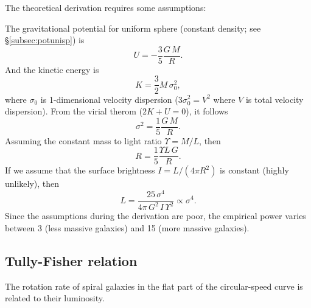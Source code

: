 The theoretical derivation requires some assumptions:

The gravitational potential for uniform sphere (constant density; see \S\ref{subsec:potunisp}) is 
\begin{equation}
    U = -\frac{3}{5} \frac{G\,M}{R}.
\end{equation}
And the kinetic energy is 
\begin{equation}
    K = \frac{3}{2} M\,\sigma_{0}^{2},
\end{equation}
where $\sigma_{0}$ is 1-dimensional velocity dispersion ($3\sigma_{0}^{2} = V^{2}$ where $V$
is total velocity dispersion). From the virial therom ($2K+U=0$), it follows
\begin{equation}
    \sigma^{2}=\frac{1}{5}\frac{G\,M}{R}.
\end{equation}
Assuming the constant mass to light ratio $\Upsilon=M/L$, then 
\begin{equation}
    R = \frac{1}{5}\frac{\Upsilon L\,G}{R}.
\end{equation}
If we assume that the surface brightness $I=L/(4\pi R^{2})$ is constant (highly unlikely),
then
\begin{equation}
    L = \frac{25\,\sigma^{4}}{4\pi\,G^{2}\,I\,\Upsilon^{2}} \propto \sigma^{4}.
\end{equation}
Since the assumptions during the derivation are poor, the empirical power varies between 3 (less massive galaxies) 
and 15 (more massive galaxies).

\bigskip
\subsection{Tully-Fisher relation}
The rotation rate of spiral galaxies in the flat part of the circular-speed curve is
related to their luminosity.

\bigskip
